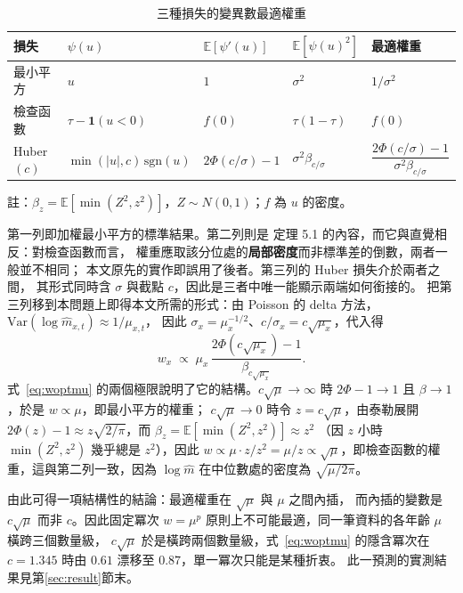 \documentclass[UTF8, fontset=macnew, a4paper, 12pt]{ctexart}
\newcommand{\Ex}{\mathbb{E}}
\begin{document}
\begin{table}[H]
\centering
\caption{三種損失的變異數最適權重}
\small
\begin{tabular}{lllll}
\toprule
損失 & $\psi(u)$ & $\Ex[\psi'(u)]$ & $\Ex[\psi(u)^2]$ & 最適權重\\
\midrule
最小平方 & $u$ & $1$ & $\sigma^2$ & $1/\sigma^2$\\
檢查函數 & $\tau-\mathbf{1}(u<0)$ & $f(0)$ & $\tau(1-\tau)$ & $f(0)$\\
Huber$(c)$ & $\min(|u|,c)\,\mathrm{sgn}(u)$ & $2\Phi(c/\sigma)-1$
  & $\sigma^2\beta_{c/\sigma}$ & $\dfrac{2\Phi(c/\sigma)-1}{\sigma^2\beta_{c/\sigma}}$\\
\bottomrule
\end{tabular}

{\footnotesize 註：$\beta_z=\Ex[\min(Z^2,z^2)]$，$Z\sim N(0,1)$；$f$ 為 $u$ 的密度。}

\label{tab:wcases}
\end{table}

第一列即加權最小平方的標準結果。第二列則是 \citet[第 5.3 節]{koenker2005}
定理 5.1 的內容，而它與直覺相反：對檢查函數而言，
權重應取該分位處的\textbf{局部密度}而非標準差的倒數，兩者一般並不相同；
本文原先的實作即誤用了後者。第三列的 Huber 損失介於兩者之間，
其形式同時含 $\sigma$ 與截點 $c$，因此是三者中唯一能顯示兩端如何銜接的。
把第三列移到本問題上即得本文所需的形式：由 Poisson 的 delta 方法，
$\mathrm{Var}(\log\hat m_{x,t})\approx1/\mu_{x,t}$，
因此 $\sigma_x=\mu_x^{-1/2}$、$c/\sigma_x=c\sqrt{\mu_x}$，代入得
\begin{equation}\label{eq:woptmu}
w_x\;\propto\;\mu_x\,\frac{2\Phi(c\sqrt{\mu_x})-1}{\beta_{c\sqrt{\mu_x}}} .
\end{equation}
式~\eqref{eq:woptmu} 的兩個極限說明了它的結構。$c\sqrt{\mu}\to\infty$ 時
$2\Phi-1\to1$ 且 $\beta\to1$，於是 $w\propto\mu$，即最小平方的權重；
$c\sqrt{\mu}\to0$ 時令 $z=c\sqrt{\mu}$，由泰勒展開
$2\Phi(z)-1\approx z\sqrt{2/\pi}$，而 $\beta_z=\Ex[\min(Z^2,z^2)]\approx z^2$
（因 $z$ 小時 $\min(Z^2,z^2)$ 幾乎總是 $z^2$），因此
$w\propto\mu\cdot z/z^{2}=\mu/z\propto\sqrt{\mu}$，即檢查函數的權重，這與第二列一致，因為 $\log\hat m$ 在中位數處的密度為 $\sqrt{\mu/2\pi}$。

由此可得一項結構性的結論：最適權重在 $\sqrt{\mu}$ 與 $\mu$ 之間內插，
而內插的變數是 $c\sqrt{\mu}$ 而非 $c$。因此固定冪次 $w=\mu^{p}$
原則上不可能最適，同一筆資料的各年齡 $\mu$ 橫跨三個數量級，
$c\sqrt{\mu}$ 於是橫跨兩個數量級，式~\eqref{eq:woptmu} 的隱含冪次在
$c=1.345$ 時由 $0.61$ 漂移至 $0.87$，單一冪次只能是某種折衷。
此一預測的實測結果見第\ref{sec:result}節末。
\end{document}
